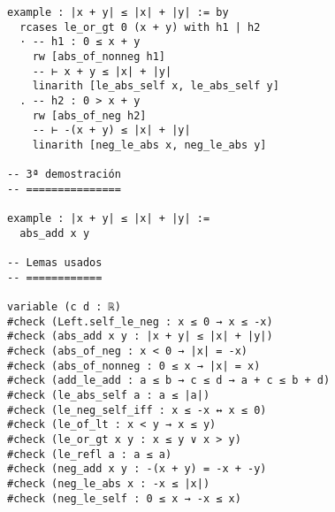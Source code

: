\begin{verbatim}
example : |x + y| ≤ |x| + |y| := by
  rcases le_or_gt 0 (x + y) with h1 | h2
  · -- h1 : 0 ≤ x + y
    rw [abs_of_nonneg h1]
    -- ⊢ x + y ≤ |x| + |y|
    linarith [le_abs_self x, le_abs_self y]
  . -- h2 : 0 > x + y
    rw [abs_of_neg h2]
    -- ⊢ -(x + y) ≤ |x| + |y|
    linarith [neg_le_abs x, neg_le_abs y]

-- 3ª demostración
-- ===============

example : |x + y| ≤ |x| + |y| :=
  abs_add x y

-- Lemas usados
-- ============

variable (c d : ℝ)
#check (Left.self_le_neg : x ≤ 0 → x ≤ -x)
#check (abs_add x y : |x + y| ≤ |x| + |y|)
#check (abs_of_neg : x < 0 → |x| = -x)
#check (abs_of_nonneg : 0 ≤ x → |x| = x)
#check (add_le_add : a ≤ b → c ≤ d → a + c ≤ b + d)
#check (le_abs_self a : a ≤ |a|)
#check (le_neg_self_iff : x ≤ -x ↔ x ≤ 0)
#check (le_of_lt : x < y → x ≤ y)
#check (le_or_gt x y : x ≤ y ∨ x > y)
#check (le_refl a : a ≤ a)
#check (neg_add x y : -(x + y) = -x + -y)
#check (neg_le_abs x : -x ≤ |x|)
#check (neg_le_self : 0 ≤ x → -x ≤ x)
\end{verbatim}

